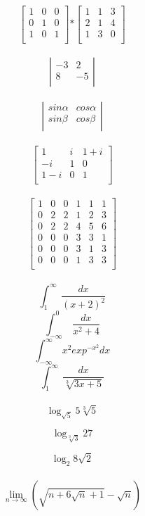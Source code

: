 \documentclass[12pt, letterpaper, titlepage]{article}
\begin{document}
\\
$$ 
\left[ \begin{array}{ccc}
1 & 0 & 0 \\
0 & 1 & 0 \\
1 & 0 & 1 \\
\end{array} \right]
\mathbf{*}
\left[ \begin{array}{ccc}
1 & 1 & 3 \\
2 & 1 & 4 \\
1 & 3 & 0 \\
\end{array} \right] 
$$
\\
$$
\left| \begin{array}{rr}
-3 & 2  \\
8 & -5  \\
\end{array} \right| 
$$
\\
$$
\left| \begin{array}{rr}
sin\alpha & cos\alpha  \\
sin\beta & cos\beta  \\
\end{array} \right| 
$$
\\
$$
\left[ \begin{array}{ccc}
1 & i & 1+i \\
-i & 1 & 0 \\
1-i & 0 & 1 \\
\end{array} \right] 
$$
\\
$$
\left[ \begin{array}{c|cc|ccc}
1 & 0 & 0 & 1 & 1 & 1 \\
\hline
0 & 2 & 2 & 1 & 2 & 3 \\
0 & 2 & 2 & 4 & 5 & 6 \\
\hline
0 & 0 & 0 & 3 & 3 & 1 \\
0 & 0 & 0 & 3 & 1 & 3 \\
0 & 0 & 0 & 1 & 3 & 3 \\
\end{array} \right] 
$$
\\
$$ \int_{1}^\infty \ \frac{dx}{(x+2)^2} $$
$$ \int_{-\infty}^{0} \ \frac{dx}{x^2+4} $$
$$ \int_{-\infty}^{\infty} \ x^2 exp^{-x^2}dx $$
$$ \int_{1}^{\infty} \ \frac{dx}{\sqrt[3]{3x+5}} $$
\\

$$\log_{\sqrt{5}}5\sqrt[3]{5}$$


$$\log_{\sqrt[3]{3}}27$$

$$\log_2 8\sqrt{2}$$
\\
$$\lim_{n\to\infty}\left( \sqrt{n+6\sqrt{n}+1}-\sqrt{n}\right) $$
\end{document}
